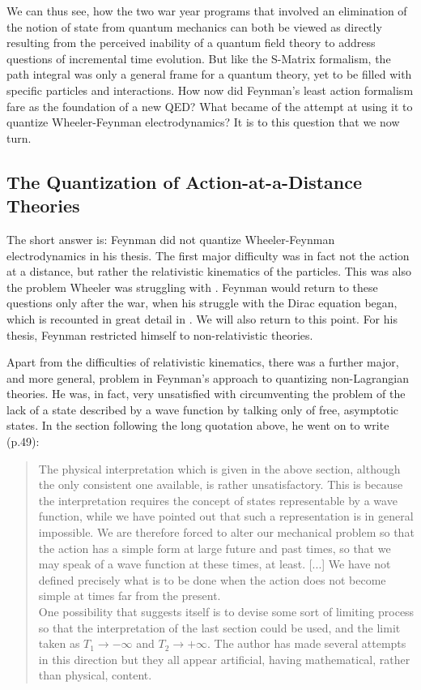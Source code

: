 \documentclass[12pt,a4paper]{article}
\begin{document}
We can thus see, how the two war year programs that involved an elimination of the notion of state from quantum mechanics can both be viewed as directly resulting from the perceived inability of a quantum field theory to address questions of incremental time evolution. But like the S-Matrix formalism, the path integral was only a general frame for a quantum theory, yet to be filled with specific particles and interactions. How now did Feynman's least action formalism fare as the foundation of a new QED? What became of the attempt at using it to quantize Wheeler-Feynman electrodynamics? It is to this question that we now turn.

\subsection{The Quantization of Action-at-a-Distance Theories}

The short answer is: Feynman did not quantize Wheeler-Feynman electrodynamics in his thesis. The first major difficulty was in fact not the action at a distance, but rather the relativistic kinematics of the particles. This was also the problem Wheeler was struggling with \citep[130]{mehra_1994_the-beat}. Feynman would return to these questions only after the war, when his struggle with the Dirac equation began, which is recounted in great detail in \citep{wuethrich_2010_the-genesis}. We will also return to this point. For his thesis, Feynman restricted himself to non-relativistic theories.

Apart from the difficulties of relativistic kinematics, there was a further major, and more general, problem in Feynman's approach to quantizing non-Lagrangian theories. He was, in fact, very unsatisfied with circumventing the problem of the lack of a state described by a wave function by talking only of free, asymptotic states. In the section following the long quotation above, he went on to write (p.49):

\begin{quote}
The physical interpretation which is given in the above section, although the only consistent one available, is rather unsatisfactory. This is because the interpretation requires the concept of states representable by a wave function, while we have pointed out that such a representation is in general impossible. We are therefore forced to alter our mechanical problem so that the action has a simple form at large future and past times, so that we may speak of a wave function at these times, at least. [...] We have not defined precisely what is to be done when the action does not become simple at times far from the present.\\
One possibility that suggests itself is to devise some sort of limiting process so that the interpretation of the last section could be used, and the limit taken as $T_1 \rightarrow - \infty$ and $T_2 \rightarrow + \infty$. The author has made several attempts in this direction but they all appear artificial, having mathematical, rather than physical, content.
\end{quote}
\end{document}
